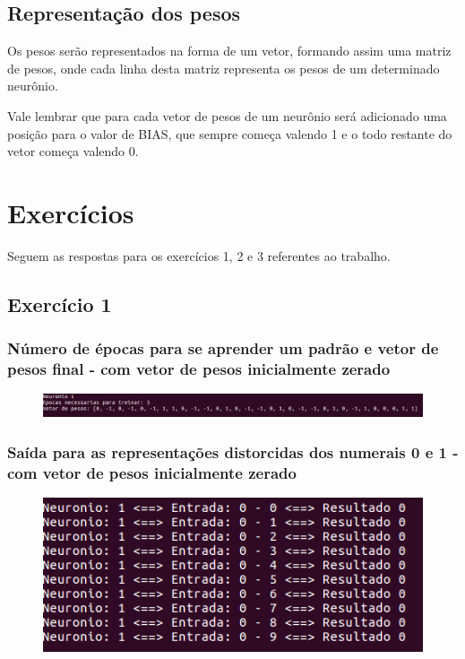 \documentclass[hidelinks,12pt]{article}
\begin{document}
		
	\subsection{Representação dos pesos}
		
		Os pesos serão representados na forma de um vetor, formando assim uma matriz de pesos, onde cada linha desta matriz representa os pesos de um determinado neurônio.
		
		Vale lembrar que para cada vetor de pesos de um neurônio será adicionado uma posição para o valor de BIAS, que sempre começa valendo 1 e o todo restante do vetor começa valendo 0.
		
\section{Exercícios}

	Seguem as respostas para os exercícios 1, 2 e 3 referentes ao trabalho.
	
	
	\subsection{Exercício 1}
	
		\subsubsection{Número de épocas para se aprender um padrão e vetor de pesos final -  com vetor de pesos inicialmente zerado}

		\begin{figure}[!h]
			\centering
			\includegraphics[scale=0.4]{Figures/E1PE1.png}
		\end{figure}
		
		\newpage
		
		\subsubsection{Saída para as representações distorcidas dos numerais 0 e 1 - com vetor de pesos inicialmente zerado}
		
		\begin{figure}[!h]
			\centering
			\includegraphics[scale=0.7]{Figures/E1S0.png}
		\end{figure}
		
\end{document}
